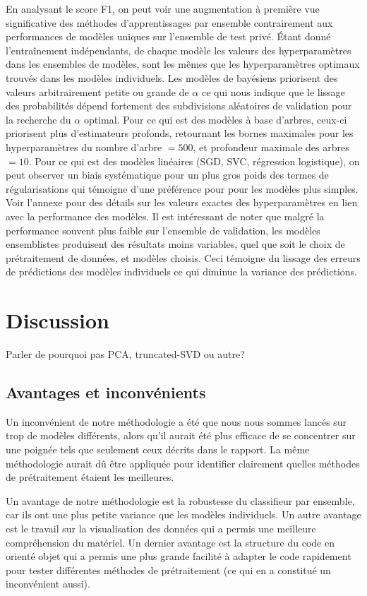 \documentclass{article}
\begin{document}
En analysant le score F1, on peut voir une augmentation à première vue significative des méthodes d'apprentissages par ensemble contrairement aux performances de modèles uniques sur l'ensemble de test privé. Étant donné l'entraînement indépendants, de chaque modèle les valeurs des hyperparamètres dans les ensembles de modèles, sont les mêmes que les hyperparamètres optimaux trouvés dans les modèles individuels. Les modèles de bayésiens priorisent des valeurs arbitrairement petite ou grande de $\alpha$ ce qui nous indique que le lissage des probabilités dépend fortement des subdivisions aléatoires de validation pour la recherche du $\alpha$ optimal. Pour ce qui est des modèles à base d'arbres, ceux-ci priorisent plus d'estimateurs profonds, retournant les bornes maximales pour les hyperparamètres du nombre d'arbre $=500$, et profondeur maximale des arbres $=10$. Pour ce qui est des modèles linéaires (SGD, SVC, régression logistique), on peut observer un biais systématique pour un plus gros poids des termes de régularisations qui témoigne d'une préférence pour pour les modèles plus simples. Voir l'annexe pour des détails sur les valeurs exactes des hyperparamètres en lien avec la performance des modèles. Il est intéressant de noter que malgré la performance souvent plus faible sur l'ensemble de validation, les modèles ensemblistes produisent des résultats moins variables, quel que soit le choix de prétraitement de données, et modèles choisis. Ceci témoigne du lissage des erreurs de prédictions des modèles individuels ce qui diminue la variance des prédictions.
\section{Discussion}
Parler de pourquoi pas PCA, truncated-SVD ou autre?
\subsection{Avantages et inconvénients}
Un inconvénient de notre méthodologie a été que nous nous sommes lancés sur trop de modèles différents, alors qu'il aurait été plus efficace de se concentrer sur une poignée tels que seulement ceux décrits dans le rapport. La même méthodologie aurait dû être appliquée pour identifier clairement quelles méthodes de prétraitement étaient les meilleures.

Un avantage de notre méthodologie est la robustesse du classifieur par ensemble, car ils ont une plus petite variance que les modèles individuels. Un autre avantage est le travail sur la visualisation des données qui a permis une meilleure compréhension du matériel. Un dernier avantage est la structure du code en orienté objet qui a permis une plus grande facilité à adapter le code rapidement pour tester différentes méthodes de prétraitement (ce qui en a constitué un inconvénient aussi).
\end{document}
